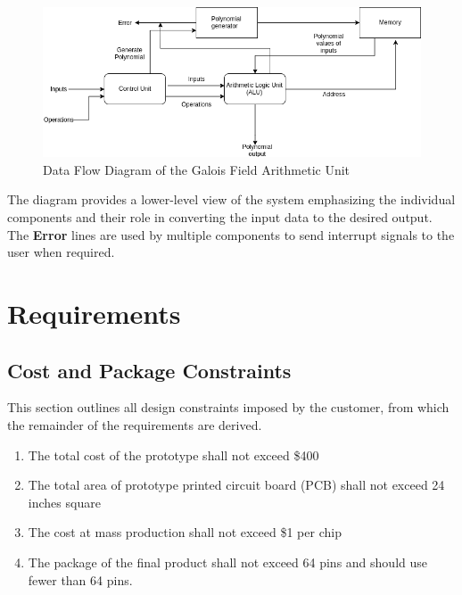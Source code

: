 \documentclass[paper=usletter, fontsize=14pt]{article}
\newcommand{\team}{Galois Field Arithmetic Unit}
\begin{document}
        \begin{figure}[ht]
            \begin{center}
                \includegraphics[width=1\textwidth]{data_flow.png}
                \caption{Data Flow Diagram of the \team~} \label{fig:data_flow}
            \end{center}
        \end{figure}

        The diagram provides a lower-level view of the system emphasizing the individual components and their role in converting the input data to the desired output. The \textbf{Error} lines are used by multiple components to send interrupt signals to the user when required.

    \section{Requirements}

        \subsection{Cost and Package Constraints}
        This section outlines all design constraints imposed by the customer, from which the remainder of the requirements are derived.

        \begin{enumerate}

            \item The total cost of the prototype shall not exceed \$400
            
            \item The total area of prototype printed circuit board (PCB) shall not exceed 24 inches square
            
            \item The cost at mass production shall not exceed \$1 per chip
            
            \item The package of the final product shall not exceed 64 pins and should use fewer than 64 pins.

        \end{enumerate}
\end{document}

